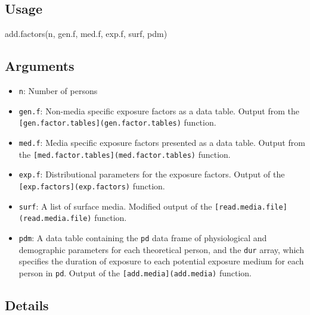 \documentclass[
]{article}
\newenvironment{Shaded}{\begin{snugshade}}{\end{snugshade}}
\newcommand{\FunctionTok}[1]{\textcolor[rgb]{0.00,0.00,0.00}{#1}}
\newcommand{\NormalTok}[1]{#1}
\providecommand{\tightlist}{%
  \setlength{\itemsep}{0pt}\setlength{\parskip}{0pt}}
\begin{document}
\hypertarget{usage-1}{%
\subsection{Usage}\label{usage-1}}

\begin{Shaded}
\begin{Highlighting}[]
\FunctionTok{add.factors}\NormalTok{(n, gen.f, med.f, exp.f, surf, pdm)}
\end{Highlighting}
\end{Shaded}

\hypertarget{arguments-1}{%
\subsection{Arguments}\label{arguments-1}}

\begin{itemize}
\tightlist
\item
  \texttt{n}: Number of persons
\item
  \texttt{gen.f}: Non-media specific exposure factors as a data table.
  Output from the \texttt{{[}gen.factor.tables{]}(gen.factor.tables)}
  function.
\item
  \texttt{med.f}: Media specific exposure factors presented as a data
  table. Output from the
  \texttt{{[}med.factor.tables{]}(med.factor.tables)} function.
\item
  \texttt{exp.f}: Distributional parameters for the exposure factors.
  Output of the \texttt{{[}exp.factors{]}(exp.factors)} function.
\item
  \texttt{surf}: A list of surface media. Modified output of the
  \texttt{{[}read.media.file{]}(read.media.file)} function.
\item
  \texttt{pdm}: A data table containing the \texttt{pd} data frame of
  physiological and demographic parameters for each theoretical person,
  and the \texttt{dur} array, which specifies the duration of exposure
  to each potential exposure medium for each person in \texttt{pd}.
  Output of the \texttt{{[}add.media{]}(add.media)} function.
\end{itemize}

\hypertarget{details-1}{%
\subsection{Details}\label{details-1}}
\end{document}
